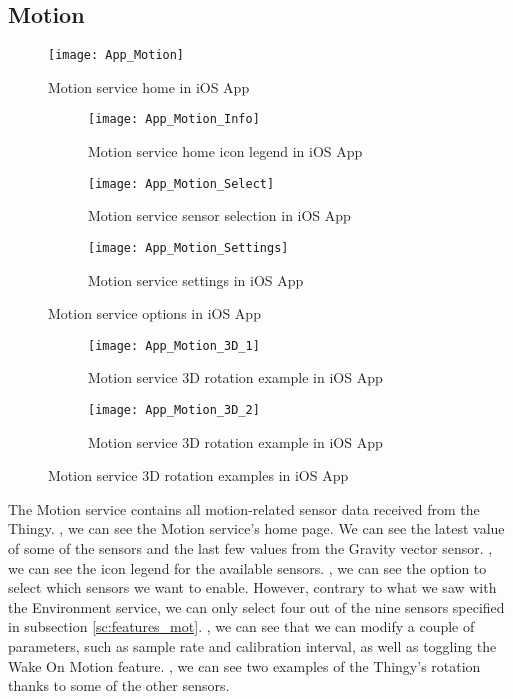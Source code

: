 \subsection{Motion}
\begin{figure}[hbt!]
	\centering
	\texttt{[image: App\_Motion]}
	\caption{Motion service home in iOS App}
	\label{fig:app_motion}
\end{figure}
\begin{figure}[hbt!]
	\centering
	\begin{subfigure}{.31\textwidth}
		\centering
		\texttt{[image: App\_Motion\_Info]}
		\caption{Motion service home icon legend in iOS App}
		\label{fig:app_motion_info}
	\end{subfigure}
	\begin{subfigure}{.31\textwidth}
		\centering
		\texttt{[image: App\_Motion\_Select]}
		\caption{Motion service sensor selection in iOS App}
		\label{fig:app_motion_select}
	\end{subfigure}
	\begin{subfigure}{.31\textwidth}
		\centering
		\texttt{[image: App\_Motion\_Settings]}
		\caption{Motion service settings in iOS App}
		\label{fig:app_motion_settings}
	\end{subfigure}
	\caption{Motion service options in iOS App}
	\label{fig:app_motion_options}
\end{figure}
\begin{figure}[hbt!]
	\centering
	\begin{subfigure}{.5\textwidth}
		\centering
		\texttt{[image: App\_Motion\_3D\_1]}
		\caption{Motion service 3D rotation example in iOS App}
		\label{fig:app_motion_3D_1}
	\end{subfigure}
	\begin{subfigure}{.5\textwidth}
		\centering
		\texttt{[image: App\_Motion\_3D\_2]}
		\caption{Motion service 3D rotation example in iOS App}
		\label{fig:app_motion_3D_2}
	\end{subfigure}
	\caption{Motion service 3D rotation examples in iOS App}
	\label{fig:app_motion_3D}
\end{figure}
The Motion service contains all motion-related sensor data received from the Thingy. , we can see the Motion service's home page. We can see the latest value of some of the sensors and the last few values from the Gravity vector sensor. , we can see the icon legend for the available sensors. , we can see the option to select which sensors we want to enable. However, contrary to what we saw with the Environment service, we can only select four out of the nine sensors specified in subsection \ref{sc:features_mot}. , we can see that we can modify a couple of parameters, such as sample rate and calibration interval, as well as toggling the Wake On Motion feature. , we can see two examples of the Thingy's rotation thanks to some of the other sensors.

